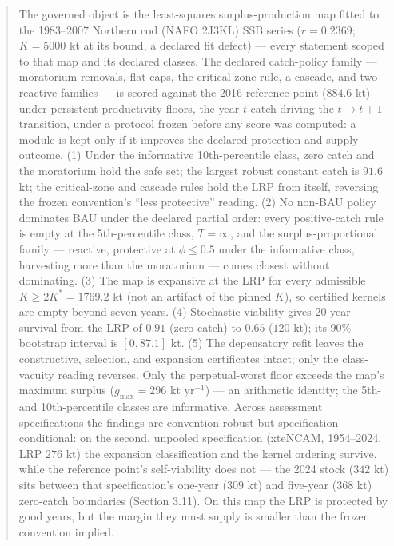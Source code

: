 \documentclass[11pt]{article}
\begin{document}
\begin{abstract}


The governed object is the least-squares surplus-production map fitted
to the 1983--2007 Northern cod (NAFO 2J3KL) SSB series (\(r = 0.2369\);
\(K = 5000\) kt at its bound, a declared fit defect) --- every statement
scoped to that map and its declared classes. The declared catch-policy
family --- moratorium removals, flat caps, the critical-zone rule, a
cascade, and two reactive families --- is scored against the 2016
reference point (\(884.6\) kt) under persistent productivity floors, the
year-\(t\) catch driving the \(t \to t+1\) transition, under a protocol
frozen before any score was computed: a module is kept only if it
improves the declared protection-and-supply outcome. (1) Under the
informative 10th-percentile class, zero catch and the moratorium hold
the safe set; the largest robust constant catch is \(91.6\) kt; the
critical-zone and cascade rules hold the LRP from itself, reversing the
frozen convention's ``less protective'' reading. (2) No non-BAU policy
dominates BAU under the declared partial order: every positive-catch
rule is empty at the 5th-percentile class, \(T=\infty\), and the
surplus-proportional family --- reactive, protective at \(\phi \le 0.5\)
under the informative class, harvesting more than the moratorium ---
comes closest without dominating. (3) The map is expansive at the LRP
for every admissible \(K \ge 2K^* = 1769.2\) kt (not an artifact of the
pinned \(K\)), so certified kernels are empty beyond seven years. (4)
Stochastic viability gives 20-year survival from the LRP of \(0.91\)
(zero catch) to \(0.65\) (\(120\) kt); its \(90\%\) bootstrap interval
is \([0, 87.1]\) kt. (5) The depensatory refit leaves the constructive,
selection, and expansion certificates intact; only the class-vacuity
reading reverses. Only the perpetual-worst floor exceeds the map's
maximum surplus (\(g_{\max} = 296\) kt yr\(^{-1}\)) --- an arithmetic
identity; the 5th- and 10th-percentile classes are informative.
Across assessment specifications the findings are convention-robust but
specification-conditional: on the second, unpooled specification
(xteNCAM, 1954--2024, LRP \(276\) kt) the expansion classification and
the kernel ordering survive, while the reference point's self-viability
does not --- the 2024 stock (\(342\) kt) sits between that
specification's one-year (\(309\) kt) and five-year (\(368\) kt)
zero-catch boundaries (Section 3.11). On this
map the LRP is protected by good years, but the margin they must supply
is smaller than the frozen convention implied.

\end{abstract}
\end{document}
